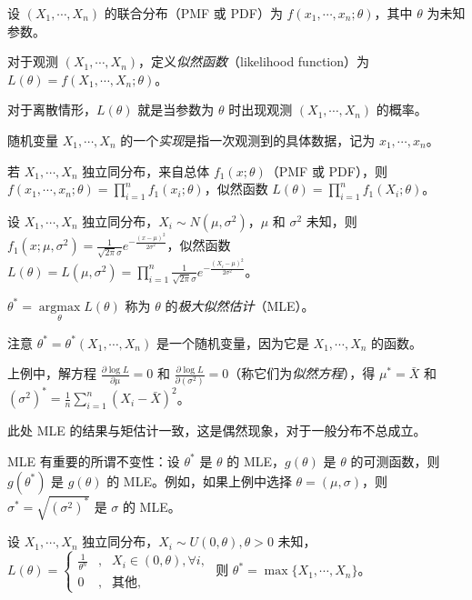 \documentclass[../main.tex]{subfiles}
\begin{document}
设 $(X_1,\cdots,X_n)$ 的联合分布（PMF 或 PDF）为 $f(x_1,\cdots,x_n;\theta)$，其中 $\theta$ 为未知参数。

对于观测 $(X_1,\cdots,X_n)$，定义\emph{似然函数}（likelihood function）为 $L(\theta)=f(X_1,\cdots,X_n;\theta)$。

对于离散情形，$L(\theta)$ 就是当参数为 $\theta$ 时出现观测 $(X_1,\cdots,X_n)$ 的概率。

随机变量 $X_1,\cdots,X_n$ 的一个\emph{实现}是指一次观测到的具体数据，记为 $x_1,\cdots,x_n$。

若 $X_1,\cdots,X_n$ 独立同分布，来自总体 $f_1(x;\theta)$（PMF 或 PDF），则 $f(x_1,\cdots,x_n;\theta)=\prod_{i=1}^nf_1(x_i;\theta)$，似然函数 $L(\theta)=\prod_{i=1}^nf_1(X_i;\theta)$。

\begin{example}
    设 $X_1,\cdots,X_n$ 独立同分布，$X_i\sim N(\mu,\sigma^2)$，$\mu$ 和 $\sigma^2$ 未知，则 $f_1(x;\mu,\sigma^2)=\frac1{\sqrt{2\pi}\sigma}e^{-\frac{(x-\mu)^2}{2\sigma^2}}$，似然函数 $L(\theta)=L(\mu,\sigma^2)=\prod_{i=1}^n\frac1{\sqrt{2\pi}\sigma}e^{-\frac{(X_i-\mu)^2}{2\sigma^2}}$。
\end{example}

\begin{definition}\label{def:6.2.1}
    $\theta^*=\underset{\theta}{\operatorname{argmax}}L(\theta)$ 称为 $\theta$ 的\emph{极大似然估计}（MLE）。
\end{definition}

注意 $\theta^*=\theta^*(X_1,\cdots,X_n)$ 是一个随机变量，因为它是 $X_1,\cdots,X_n$ 的函数。

\begin{example}
    上例中，解方程 $\frac{\partial\log L}{\partial\mu}=0$ 和 $\frac{\partial\log L}{\partial(\sigma^2)}=0$（称它们为\emph{似然方程}），得 $\mu^*=\bar X$ 和 $(\sigma^2)^*=\frac1n\sum_{i=1}^n(X_i-\bar X)^2$。
\end{example}

此处 MLE 的结果与矩估计一致，这是偶然现象，对于一般分布不总成立。

\begin{proposition}
    MLE 有重要的所谓不变性：设 $\theta^*$ 是 $\theta$ 的 MLE，$g(\theta)$ 是 $\theta$ 的可测函数，则 $g(\theta^*)$ 是 $g(\theta)$ 的 MLE。例如，如果上例中选择 $\theta=(\mu,\sigma)$，则 $\sigma^*=\sqrt{(\sigma^2)^*}$ 是 $\sigma$ 的 MLE。
\end{proposition}

\begin{example}
    设 $X_1,\cdots,X_n$ 独立同分布，$X_i\sim U(0,\theta),\theta>0$ 未知，$L(\theta)=\left\{
        \begin{aligned}
            \frac1{\theta^n} & , & X_i\in (0,\theta),\forall i, \\
            0                & , & \text{其他},
        \end{aligned}\right.$ 则 $\theta^*=\max\{X_1,\cdots,X_n\}$。
\end{example}
\end{document}
